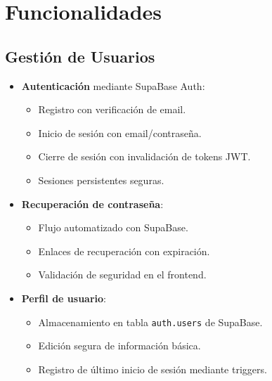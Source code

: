 \section{Funcionalidades}
\subsection{Gestión de Usuarios}
\begin{itemize}
    \item \textbf{Autenticación} mediante SupaBase Auth:
    \begin{itemize}
        \item Registro con verificación de email.
        \item Inicio de sesión con email/contraseña.
        \item Cierre de sesión con invalidación de tokens JWT.
        \item Sesiones persistentes seguras.
    \end{itemize}
    
    \item \textbf{Recuperación de contraseña}:
    \begin{itemize}
        \item Flujo automatizado con SupaBase.
        \item Enlaces de recuperación con expiración.
        \item Validación de seguridad en el frontend.
    \end{itemize}
    
    \item \textbf{Perfil de usuario}:
    \begin{itemize}
        \item Almacenamiento en tabla \texttt{auth.users} de SupaBase.
        \item Edición segura de información básica.
        \item Registro de último inicio de sesión mediante triggers.
    \end{itemize}
\end{itemize}

